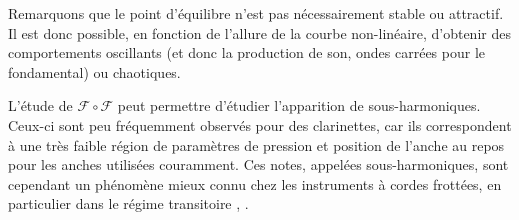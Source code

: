 \documentclass[atiam, article]{rapport} %
\begin{document}



Remarquons que le point d'équilibre n'est pas nécessairement stable ou attractif. Il est donc possible, en fonction de l'allure de la courbe non-linéaire, d'obtenir des comportements oscillants (et donc la production de son, ondes carrées pour le fondamental) ou chaotiques. %

L'étude de $\mathcal{F} \circ \mathcal{F}$ peut permettre d'étudier l'apparition de sous-harmoniques. Ceux-ci sont peu fréquemment observés pour des clarinettes, car ils correspondent à une très faible région de paramètres de pression et position de l'anche au repos pour les anches utilisées couramment. Ces notes, appelées sous-harmoniques, sont cependant un phénomène mieux connu chez les instruments à cordes frottées, en particulier dans le régime transitoire \cite{kergomard_instruments_1997}, \cite{mcintyre_oscillations_1983}.
\end{document}
